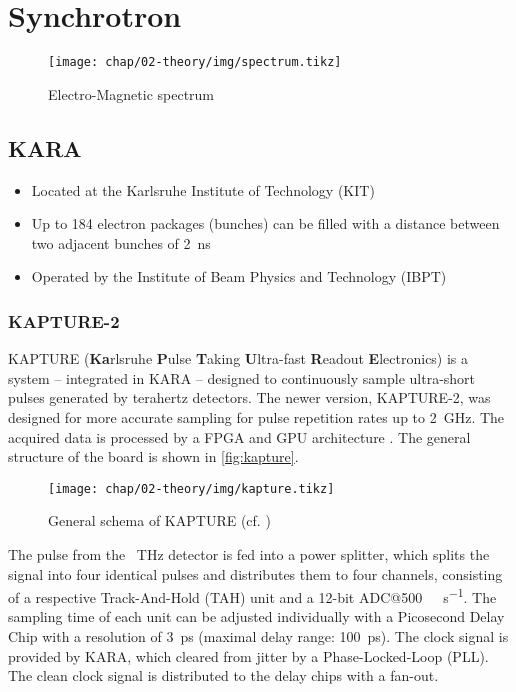 \section{Synchrotron}
\begin{figure}[H]
	\centering
	\texttt{[image: chap/02-theory/img/spectrum.tikz]}
	\caption{Electro-Magnetic spectrum}
	\label{fig:spectrum}
\end{figure}

\newpage
\subsection{KARA}

\begin{itemize}
	\item Located at the Karlsruhe Institute of Technology (KIT)
	\item Up to 184 electron packages (bunches) can be filled with a distance between two adjacent bunches of \SI{2}{\nano \second}
	\item Operated by the Institute of Beam Physics and Technology (IBPT)
\end{itemize}

\subsubsection{KAPTURE-2}
KAPTURE (\textbf{Ka}rlsruhe \textbf{P}ulse \textbf{T}aking \textbf{U}ltra-fast \textbf{R}eadout \textbf{E}lectronics) is a system -- integrated in KARA -- designed to continuously sample ultra-short pulses generated by terahertz detectors. The newer version, KAPTURE-2, was designed for more accurate sampling for pulse repetition rates up to \SI{2}{\giga \hertz}. The acquired data is processed by a FPGA and GPU architecture \cite{caselleKAP}.
The general structure of the board is shown in \autoref{fig:kapture}.

\begin{figure}[H]
	\centering
	\texttt{[image: chap/02-theory/img/kapture.tikz]}
	\caption{General schema of KAPTURE (cf. \cite[p.2]{caselleKAP})}
	\label{fig:kapture}
\end{figure}

The pulse from the \SI{}{\tera \hertz} detector is fed into a power splitter, which splits the signal into four identical pulses and distributes them to four channels, consisting of a respective Track-And-Hold (TAH) unit and a 12-bit ADC@\SI{500}{\mega\sample\per\second}. The sampling time of each unit can be adjusted individually with a Picosecond Delay Chip with a resolution of \SI{3}{\pico \second} (maximal delay range: \SI{100}{\pico \second}). 
The clock signal is provided by KARA, which cleared from jitter by a Phase-Locked-Loop (PLL). The clean clock signal is distributed to the delay chips with a fan-out. \cite{caselleKAP}

